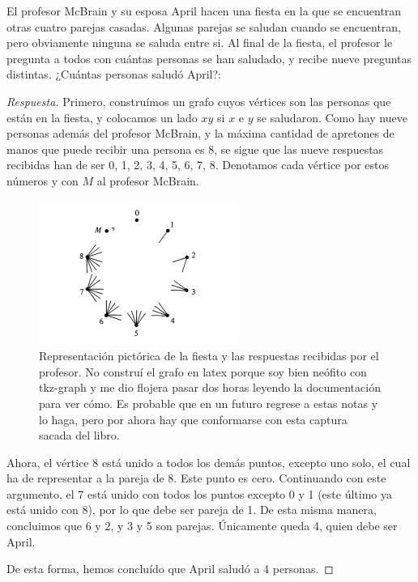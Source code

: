 \begin{ejem}
    El profesor McBrain y su esposa April hacen una fiesta en la que se encuentran otras cuatro parejas casadas. Algunas parejas se saludan cuando se encuentran, pero obviamente ninguna se saluda entre si. Al final de la fiesta, el profesor le pregunta a todos con cuántas personas se han saludado, y recibe nueve preguntas distintas. ¿Cuántas personas saludó April?:
\end{ejem}

    \begin{proof}[Respuesta]
    Primero, construímos un grafo cuyos vértices son las personas que están en la fiesta, y colocamos un lado $xy$ si $x$ e $y$ se saludaron. Como hay nueve personas además del profesor McBrain, y la máxima cantidad de apretones de manos que puede recibir una persona es 8, se sigue que las nueve respuestas recibidas han de ser 0, 1, 2, 3, 4, 5, 6, 7, 8. Denotamos cada vértice por estos números y con $M$ al profesor McBrain.
    
    \begin{figure}[h]
        \centering
        \includegraphics[scale=0.9]{img/Mcbrain.png}
        \caption{Representación pictórica de la fiesta y las respuestas recibidas por el profesor. No construí el grafo en latex porque soy bien neófito con tkz-graph y me dio flojera pasar dos horas leyendo la documentación para ver cómo. Es probable que en un futuro regrese a estas notas y lo haga, pero por ahora hay que conformarse con esta captura sacada del libro.}
    \end{figure}
    
    Ahora, el vértice 8 está unido a todos los demás puntos, excepto uno solo, el cual ha de representar a la pareja de 8. Este punto es cero. Continuando con este argumento, el 7 está unido con todos los puntos excepto 0 y 1 (este último ya está unido con 8), por lo que debe ser pareja de 1. De esta misma manera, concluimos que 6 y 2, y 3 y 5 son parejas. Únicamente queda 4, quien debe ser April.
    
    De esta forma, hemos concluído que April saludó a 4 personas.
\end{proof}

